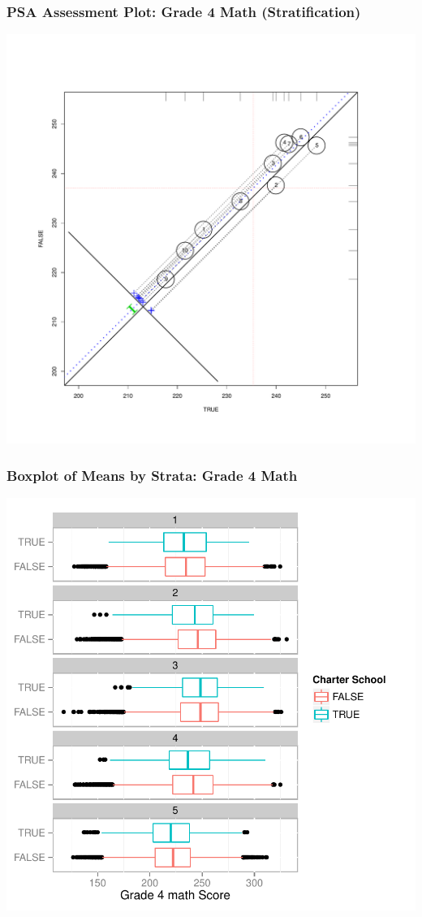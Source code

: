 \documentclass[10pt,handout,mathserif]{beamer}
\begin{document}
\begin{frame}[c]
	\frametitle{PSA Assessment Plot: Grade 4 Math (Stratification)}
	\begin{center}
	\includegraphics[height=0.9\textheight,keepaspectratio]{../Figures2009/g4math-circpsa10}
	\end{center}
\end{frame}

\begin{frame}[c]
	\frametitle{Boxplot of Means by Strata: Grade 4 Math}
	\begin{center}
	\includegraphics[height=0.86\textheight,keepaspectratio]{../Figures2009/g4math-strata5-boxplot}
	\end{center}
\end{frame}
\end{document}
